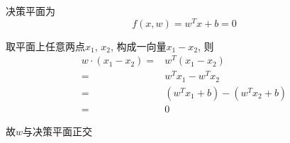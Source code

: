 \documentclass[../main.tex]{subfiles}
\begin{document}
决策平面为
$$
f(x,w) = w^Tx + b = 0
$$

取平面上任意两点$x_1$, $x_2$, 构成一向量$x_1 - x_2$, 则
\begin{align*}
w \cdot (x_1 - x_2)
= & w^T (x_1 - x_2) \\
= & w^T x_1 - w^T x_2 \\
= & (w^T x_1 + b) - (w^T x_2 + b) \\
= & 0
\end{align*}

故$w$与决策平面正交
\end{document}
